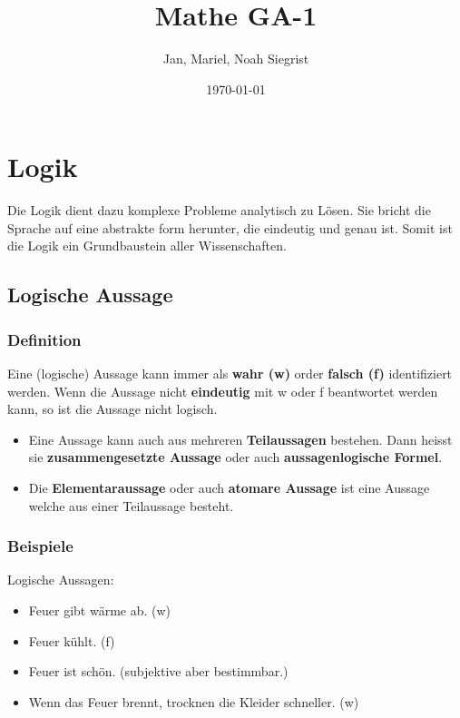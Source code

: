 \documentclass{article}
\title{Mathe GA-1}
\author{Jan, Mariel, Noah Siegrist}
\date{\today}
\begin{document}
\maketitle	
\tableofcontents
\newpage

\section{Logik}
Die Logik dient dazu komplexe Probleme analytisch zu Lösen. Sie bricht die Sprache auf eine abstrakte form herunter, die eindeutig und genau ist. Somit ist die Logik ein Grundbaustein aller Wissenschaften.

\subsection{Logische Aussage}

\subsubsection{Definition}

Eine (logische) Aussage kann immer als \textbf{wahr (w)} order \textbf{falsch (f)} identifiziert werden. Wenn die Aussage nicht \textbf{eindeutig} mit w oder f beantwortet werden kann, so ist die Aussage nicht logisch.

\begin{itemize}
	\item[] Eine Aussage kann auch aus mehreren \textbf{Teilaussagen} bestehen. Dann heisst sie \textbf{zusammengesetzte Aussage} oder auch \textbf{aussagenlogische Formel}.
	\item[] Die \textbf{Elementaraussage} oder auch \textbf{atomare Aussage} ist eine Aussage welche aus einer Teilaussage besteht.
\end{itemize}

\subsubsection{Beispiele}

Logische Aussagen:
\begin{itemize}
  \item Feuer gibt wärme ab. (w)
  \item Feuer kühlt. (f)
  \item Feuer ist schön. (subjektive aber bestimmbar.)
  \item Wenn das Feuer brennt, trocknen die Kleider schneller. (w)
\end{itemize}
\end{document}
